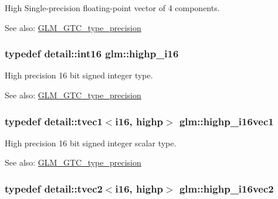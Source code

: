 High Single-precision floating-point vector of 4 components. \begin{Desc}
\item[See also:]\hyperlink{group__gtc__type__precision}{GLM\_\-GTC\_\-type\_\-precision} \end{Desc}
\hypertarget{group__gtc__type__precision_ga04399853952dbce29cb62e2432f350a}{
\subsubsection[highp\_\-i16]{\setlength{\rightskip}{0pt plus 5cm}typedef detail::int16 {\bf glm::highp\_\-i16}}}
\label{group__gtc__type__precision_ga04399853952dbce29cb62e2432f350a}


High precision 16 bit signed integer type. \begin{Desc}
\item[See also:]\hyperlink{group__gtc__type__precision}{GLM\_\-GTC\_\-type\_\-precision} \end{Desc}
\hypertarget{group__gtc__type__precision_g0ed3103e2d3acb4efbe313add4243a72}{
\subsubsection[highp\_\-i16vec1]{\setlength{\rightskip}{0pt plus 5cm}typedef detail::tvec1$<$i16, highp$>$ {\bf glm::highp\_\-i16vec1}}}
\label{group__gtc__type__precision_g0ed3103e2d3acb4efbe313add4243a72}


High precision 16 bit signed integer scalar type. \begin{Desc}
\item[See also:]\hyperlink{group__gtc__type__precision}{GLM\_\-GTC\_\-type\_\-precision} \end{Desc}
\hypertarget{group__gtc__type__precision_g74df9e215c049f82d277473c4c974bb4}{
\subsubsection[highp\_\-i16vec2]{\setlength{\rightskip}{0pt plus 5cm}typedef detail::tvec2$<$i16, highp$>$ {\bf glm::highp\_\-i16vec2}}}
\label{group__gtc__type__precision_g74df9e215c049f82d277473c4c974bb4}



